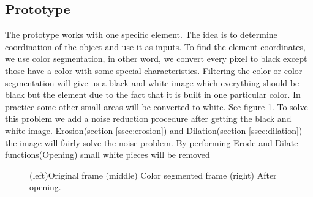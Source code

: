 \subsection{Prototype}
The prototype works with one specific element. The idea is to determine coordination of the object and use it as inputs. To find the element coordinates, we use color segmentation, in other word, we convert every pixel to black except those have a color with some special characteristics. Filtering the color or color segmentation will give us a black and white image which everything should be black but the element due to the fact that it is built in one particular color. In practice some other small areas will be converted to white. See figure \ref{fig:blue}. To solve this problem we add a noise reduction procedure after getting the black and white image. Erosion(section \ref{ssec:erosion}) and Dilation(section \ref{ssec:dilation})  the image will fairly solve the noise problem. By performing Erode and Dilate functions(Opening) small white pieces will be removed

\begin{figure}
\caption{(left)Original frame (middle) Color segmented frame (right) After opening.}
\label{fig:blue}
\end{figure}
 
